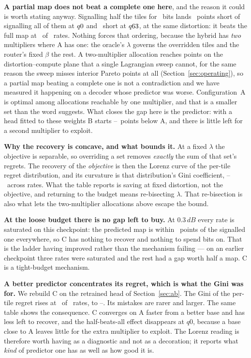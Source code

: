 \documentclass[10pt,twocolumn,letterpaper]{article}
\newcommand{\dB}{\,dB}
\begin{document}
\textbf{A partial map does not beat a complete one here}, and the reason it
could is worth stating anyway. Signalling half the tiles for \HybridBitsHalf\
bits lands \HybridHalfShortLo\ points short of signalling all of them at
$q0$ and \HybridHalfShortHi\ short at
$q63$, at the same distortion: it beats the full map at
\HybridHalfVsFullN\ of \HybridHalfVsFullOf\ rates. Nothing forces that ordering, because
the hybrid has \emph{two} multipliers where A has one: the oracle's $\lambda$
governs the overridden tiles and the router's fixed $\beta$ the rest. A
two-multiplier allocation reaches points on the distortion--compute plane that a
single Lagrangian sweep cannot, for the same reason the sweep misses interior
Pareto points at all (Section~\ref{sec:operating}), so a partial map beating a
complete one is not a contradiction and we have measured it happening on a
decoder whose predictor was worse. Configuration~A is optimal among allocations
reachable by one multiplier, and that is a smaller set than the word suggests.
What closes the gap here is the predictor: with a head fitted to these weights B
starts \HybridStartGapLo--\HybridStartGapHi\ points below A, and there is little
left for a second multiplier to exploit.

\textbf{Why the recovery is concave, and what bounds it.} At a fixed $\lambda$
the objective is separable, so overriding a set removes \emph{exactly} the sum
of that set's regrets. The recovery of the \emph{objective} is then the Lorenz
curve of the per-tile regret distribution, and its curvature is that
distribution's Gini coefficient, \GiniMin--\GiniMax\ across rates. What the
table reports is saving at fixed distortion, not the objective, and returning to
the budget means re-bisecting $\lambda$. That re-bisection is also what lets the
two-multiplier allocations above escape the bound.

\textbf{At the loose budget there is no gap left to buy.} At $0.3\dB$ every rate
is saturated on this checkpoint: the predicted map is within
\HybridLooseGapMax\ points of the signalled one everywhere, so C has nothing to
recover and nothing to spend bits on. That is the ladder having improved rather
than the mechanism failing --- on an earlier checkpoint three rates were
saturated and the rest had a gap worth half a map. C is a tight-budget
mechanism.

\textbf{A better predictor concentrates its regret, which is what the Gini was
for.} We rebuild C on the retrained head of Section~\ref{sec:ab}. The Gini of the
per-tile regret rises at \GiniRetrainUpN\ of \GiniRetrainOfN\ rates, to
\GiniRetrainLo--\GiniRetrainHi. Its mistakes are rarer and larger. The same
table shows the consequence. C converges on A faster from a better base and has
less left to recover, and the half-beats-all effect disappears at $q0$, because
a base close to A leaves little for the extra multiplier to exploit. The Lorenz
reading is therefore worth having as a diagnostic and not as a decoration; it
reports what \emph{kind} of predictor one has as well as how good it is.
\end{document}
